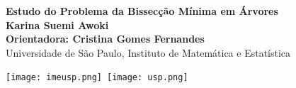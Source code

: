\documentclass[a0,portrait]{a0poster}
\begin{document}


\begin{minipage}[b]{0.75\linewidth}
\VeryHuge \center \color{NavyBlue} \textbf{Estudo do Problema da Bissecção Mínima em Árvores} \color{Black}\\ %
[1.2cm]
\huge \textbf{Karina Suemi Awoki}\\[0.6cm] %
\huge \textbf{Orientadora: Cristina Gomes Fernandes}\\[0.6cm] %

\huge Universidade de São Paulo, Instituto de Matemática e Estatística\\[0.5cm] %
\end{minipage}
%
\begin{minipage}[b]{0.25\linewidth}
\texttt{[image: imeusp.png]}\
\texttt{[image: usp.png]}\\
\end{minipage}

\vspace{2cm} %

\end{document}

